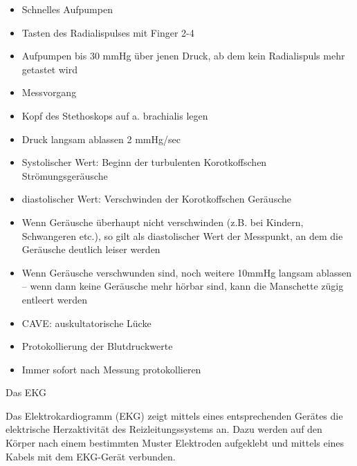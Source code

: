 \documentclass{article}
\begin{document}
\begin{itemize}
\item Schnelles Aufpumpen

\item Tasten des Radialispulses mit Finger 2-4

\item Aufpumpen bis 30 mmHg \"uber jenen Druck, ab dem kein Radialispuls
mehr getastet wird

\end{itemize}
\begin{itemize}
\item Messvorgang

\end{itemize}
\begin{itemize}
\item Kopf des Stethoskops auf a. brachialis legen

\item Druck langsam ablassen 2 mmHg/sec

\item Systolischer Wert: Beginn der turbulenten Korotkoffschen
Str\"omungsger\"ausche

\item diastolischer Wert: Verschwinden der Korotkoffschen Ger\"ausche

\item Wenn Ger\"ausche \"uberhaupt nicht verschwinden (z.B. bei Kindern,
Schwangeren etc.), so gilt als diastolischer Wert der Messpunkt, an dem
die Ger\"ausche deutlich leiser werden

\item Wenn Ger\"ausche verschwunden sind, noch weitere 10mmHg langsam
ablassen -- wenn dann keine Ger\"ausche mehr h\"orbar sind, kann die
Manschette z\"ugig entleert werden

\item CAVE: auskultatorische L\"ucke

\end{itemize}
\begin{itemize}
\item Protokollierung der Blutdruckwerte

\end{itemize}
\begin{itemize}
\item Immer sofort nach Messung protokollieren

\end{itemize}
Das EKG

Das Elektrokardiogramm (EKG) zeigt mittels eines entsprechenden
Ger\"ates die elektrische Herzaktivit\"at des Reizleitungssystems an.
Dazu werden auf den K\"orper nach einem bestimmten Muster Elektroden
aufgeklebt und mittels eines Kabels mit dem EKG-Ger\"at verbunden. 
\end{document}
